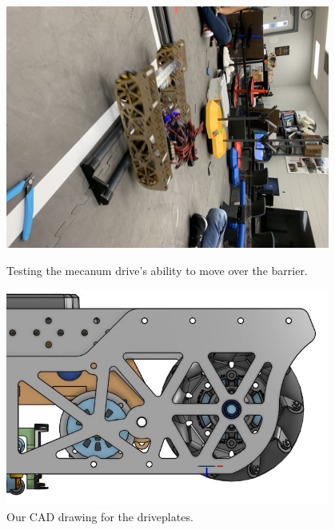 \begin{figure}[ht]
\centering
\begin{minipage}[b]{.48\textwidth}
  \centering
  \includegraphics[width=0.95\textwidth]{Meetings/September/09-30-21/9-30-21_Hardware_Image3 - Nathan Forrer.JPG}
  \caption{Testing the mecanum drive's ability to move over the barrier.}
  \label{fig:pic1}
\end{minipage}%
\hfill%
\begin{minipage}[b]{.48\textwidth}
  \centering
  \includegraphics[width=0.95\textwidth]{Meetings/September/09-30-21/9-30-21_Hardware_Image4 - Nathan Forrer.JPG}
  \caption{Our CAD drawing for the driveplates.}
  \label{fig:pic2}
\end{minipage}
\end{figure}

